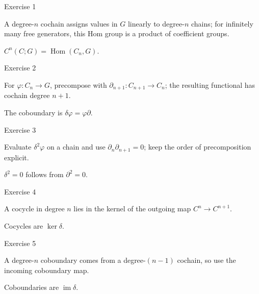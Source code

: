 \begin{exercise}\label{exr:viii28-01}
Exercise 1
\end{exercise}
\begin{hint}
A degree-\(n\) cochain assigns values in \(G\) linearly to degree-\(n\) chains; for infinitely many free generators, this Hom group is a product of coefficient groups.
\end{hint}
\begin{solution}
\(C^n(C;G)=\operatorname{Hom}(C_n,G)\).
\end{solution}

\begin{exercise}\label{exr:viii28-02}
Exercise 2
\end{exercise}
\begin{hint}
For \(\varphi:C_n\to G\), precompose with \(\partial_{n+1}:C_{n+1}\to C_n\); the resulting functional has cochain degree \(n+1\).
\end{hint}
\begin{solution}
The coboundary is \(\delta\varphi=\varphi\partial\).
\end{solution}

\begin{exercise}\label{exr:viii28-03}
Exercise 3
\end{exercise}
\begin{hint}
Evaluate \(\delta^2\varphi\) on a chain and use \(\partial_n\partial_{n+1}=0\); keep the order of precomposition explicit.
\end{hint}
\begin{solution}
\(\delta^2=0\) follows from \(\partial^2=0\).
\end{solution}

\begin{exercise}\label{exr:viii28-04}
Exercise 4
\end{exercise}
\begin{hint}
A cocycle in degree \(n\) lies in the kernel of the outgoing map \(C^n\to C^{n+1}\).
\end{hint}
\begin{solution}
Cocycles are \(\ker\delta\).
\end{solution}

\begin{exercise}\label{exr:viii28-05}
Exercise 5
\end{exercise}
\begin{hint}
A degree-\(n\) coboundary comes from a degree-\((n-1)\) cochain, so use the incoming coboundary map.
\end{hint}
\begin{solution}
Coboundaries are \(\operatorname{im}\delta\).
\end{solution}

